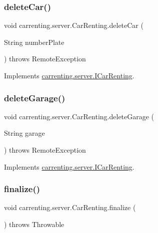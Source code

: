 \subsubsection{\texorpdfstring{deleteCar()}{deleteCar()}}
{\footnotesize\ttfamily void carrenting.\+server.\+Car\+Renting.\+delete\+Car (\begin{DoxyParamCaption}\item[{String}]{number\+Plate }\end{DoxyParamCaption}) throws Remote\+Exception}



Implements \mbox{\hyperlink{interfacecarrenting_1_1server_1_1_i_car_renting_ac3730576a7df8ac11f89d1cc9ad4158a}{carrenting.\+server.\+I\+Car\+Renting}}.

\mbox{\label{classcarrenting_1_1server_1_1_car_renting_ad1b784e2383f3c5ea6de3783fe4306f7}} 
\subsubsection{\texorpdfstring{deleteGarage()}{deleteGarage()}}
{\footnotesize\ttfamily void carrenting.\+server.\+Car\+Renting.\+delete\+Garage (\begin{DoxyParamCaption}\item[{String}]{garage }\end{DoxyParamCaption}) throws Remote\+Exception}



Implements \mbox{\hyperlink{interfacecarrenting_1_1server_1_1_i_car_renting_a962ebc71ee856ffdda808876d3a26e79}{carrenting.\+server.\+I\+Car\+Renting}}.

\mbox{\label{classcarrenting_1_1server_1_1_car_renting_ae7f5b4e17063c96ae0d81b230f79f549}} 
\subsubsection{\texorpdfstring{finalize()}{finalize()}}
{\footnotesize\ttfamily void carrenting.\+server.\+Car\+Renting.\+finalize (\begin{DoxyParamCaption}{ }\end{DoxyParamCaption}) throws Throwable\hspace{0.3cm}{\ttfamily [protected]}}

